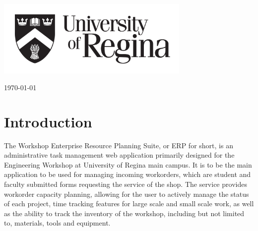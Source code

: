 \begin{titlepage}
	
	\vfill\vfill\vfill\vfill
	\includegraphics[width=0.7\textwidth]{UR.png}\\[2cm] %
	 

	
	\vfill\vfill\vfill %
	
	{\large\today} %
	
	
	\vfill %
	
\end{titlepage}



\newpage 
\tableofcontents

\newpage
\listoffigures

\newpage
\section{Introduction}
The Workshop Enterprise Resource Planning Suite, or ERP for short, is an administrative task management web application primarily designed for the Engineering Workshop at University of Regina main campus. It is to be the main application to be used for managing incoming workorders, which are student and faculty submitted forms requesting the service of the shop. The service provides workorder capacity planning, allowing for the user to actively manage the status of each project, time tracking features for large scale and small scale work, as well as the ability to track the inventory of the workshop, including but not limited to, materials, tools and equipment. 
